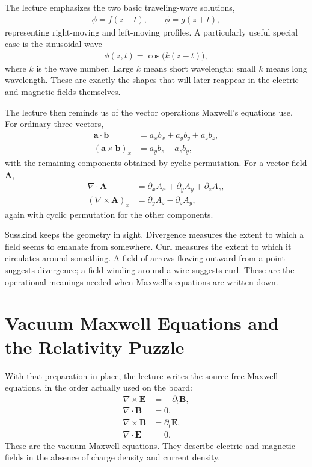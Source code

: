 The lecture emphasizes the two basic traveling-wave solutions,
\begin{align}
\phi = f(z-t), \qquad \phi = g(z+t),
\end{align}
representing right-moving and left-moving profiles. A particularly useful special case is the sinusoidal wave
\begin{align}
\phi(z,t) = \cos\!\bigl(k(z-t)\bigr),
\end{align}
where \(k\) is the wave number. Large \(k\) means short wavelength; small \(k\) means long wavelength. These are exactly the shapes that will later reappear in the electric and magnetic fields themselves.

The lecture then reminds us of the vector operations Maxwell's equations use. For ordinary three-vectors,
\begin{align}
\mathbf a \cdot \mathbf b &= a_x b_x + a_y b_y + a_z b_z,\\
(\mathbf a \times \mathbf b)_x &= a_y b_z - a_z b_y,
\end{align}
with the remaining components obtained by cyclic permutation. For a vector field \(\mathbf A\),
\begin{align}
\nabla \cdot \mathbf A &= \partial_x A_x + \partial_y A_y + \partial_z A_z,\\
(\nabla \times \mathbf A)_x &= \partial_y A_z - \partial_z A_y,
\end{align}
again with cyclic permutation for the other components.

Susskind keeps the geometry in sight. Divergence measures the extent to which a field seems to emanate from somewhere. Curl measures the extent to which it circulates around something. A field of arrows flowing outward from a point suggests divergence; a field winding around a wire suggests curl. These are the operational meanings needed when Maxwell's equations are written down.

\section{Vacuum Maxwell Equations and the Relativity Puzzle}

With that preparation in place, the lecture writes the source-free Maxwell equations, in the order actually used on the board:
\begin{align}
\nabla \times \mathbf E &= -\,\partial_t \mathbf B,\\
\nabla \cdot \mathbf B &= 0,\\
\nabla \times \mathbf B &= \partial_t \mathbf E,\\
\nabla \cdot \mathbf E &= 0.
\end{align}
These are the vacuum Maxwell equations. They describe electric and magnetic fields in the absence of charge density and current density.

